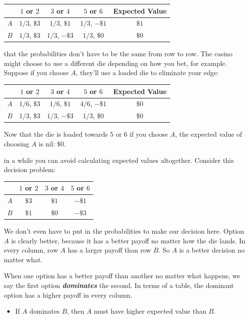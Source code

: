 \documentclass[justified]{tufte-book}
\newenvironment{info}{\begin{itemize}\item[\Info]}{\end{itemize}}
\theoremstyle{definition}
\theoremstyle{definition}
\theoremstyle{definition}
\theoremstyle{remark}
\begin{document}
\begin{longtable}[]{@{}lcccc@{}}
\toprule
& \(1\) or \(2\) & \(3\) or \(4\) & \(5\) or \(6\) & Expected Value\tabularnewline
\midrule
\endhead
\(A\) & \(1/3\), \(\$3\) & \(1/3\), \(\$1\) & \(1/3\), \(-\$1\) & \(\$1\)\tabularnewline
\(B\) & \(1/3\), \(\$3\) & \(1/3\), \(-\$3\) & \(1/3\), \(\$0\) & \(\$0\)\tabularnewline
\bottomrule
\end{longtable}

 that the probabilities don't have to be the same from row to row. The casino might choose to use a different die depending on how you bet, for example. Suppose if you choose \(A\), they'll use a loaded die to eliminate your edge:

\begin{longtable}[]{@{}lcccc@{}}
\toprule
& \(1\) or \(2\) & \(3\) or \(4\) & \(5\) or \(6\) & Expected Value\tabularnewline
\midrule
\endhead
\(A\) & \(1/6\), \(\$3\) & \(1/6\), \(\$1\) & \(4/6\), \(-\$1\) & \(\$0\)\tabularnewline
\(B\) & \(1/3\), \(\$3\) & \(1/3\), \(-\$3\) & \(1/3\), \(\$0\) & \(\$0\)\tabularnewline
\bottomrule
\end{longtable}

Now that the die is loaded towards \(5\) or \(6\) if you choose \(A\), the expected value of choosing \(A\) is nil: \(\$0\).

 in a while you can avoid calculating expected values altogether. Consider this decision problem:

\begin{longtable}[]{@{}lccc@{}}
\toprule
& \(1\) or \(2\) & \(3\) or \(4\) & \(5\) or \(6\)\tabularnewline
\midrule
\endhead
\(A\) & \(\$3\) & \(\$1\) & \(-\$1\)\tabularnewline
\(B\) & \(\$1\) & \(\$0\) & \(-\$3\)\tabularnewline
\bottomrule
\end{longtable}

We don't even have to put in the probabilities to make our decision here. Option \(A\) is clearly better, because it has a better payoff no matter how the die lands. In every column, row \(A\) has a larger payoff than row \(B\). So \(A\) is a better decision no matter what.

When one option has a better payoff than another no matter what happens, we say the first option \textbf{\emph{dominates}} the second. In terms of a table, the dominant option has a higher payoff in every column.

\begin{info}
If \(A\) dominates \(B\), then \(A\) must have higher expected value
than \(B\).
\end{info}
\end{document}
